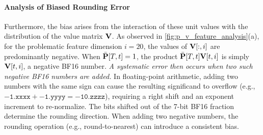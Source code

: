 \documentclass{article} %
\begin{document}
\paragraph{Analysis of Biased Rounding Error}
Furthermore, the bias arises from the interaction of these unit values with the distribution of the value matrix ${\mathbf{V}}$. As observed in \cref{fig:p_v_feature_analysis}(a), for the problematic feature dimension $i=20$, the values of ${\mathbf{V}}[:, i]$ are predominantly negative. When $\bar{{\mathbf{P}}}[T, t]=1$, the product $\bar{{\mathbf{P}}}[T, t]{\mathbf{V}}[t, i]$ is simply ${\mathbf{V}}[t, i]$, a negative BF16 number.
\emph{A systematic error then occurs when two such negative BF16 numbers are added.} In floating-point arithmetic, adding two numbers with the same sign can cause the resulting significand to overflow (e.g., $\mathtt{-1.xxxx} + \mathtt{-1.yyyy}=\mathtt{-10.zzzz}$), requiring a right shift and an exponent increment to re-normalize. The bits shifted out of the 7-bit BF16 fraction determine the rounding direction. When adding two negative numbers, the rounding operation (e.g., round-to-nearest) can introduce a consistent bias.
\end{document}
